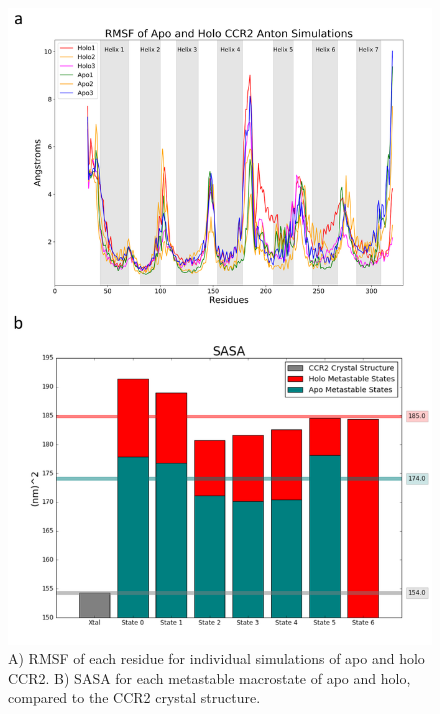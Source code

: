 \begin{figure}[htbp]
  \begin{center}
  \includegraphics[width=\textwidth,height=0.9\textheight,keepaspectratio]{./figures/rmsf_sasa.png}
 \caption[RMSF and SASA analysis of CCR2]{A) RMSF of each residue for individual simulations of apo and holo CCR2. B) SASA for each metastable macrostate of apo and holo, compared to the CCR2 crystal structure.}
  \label{fig:rmsf_sasa}
\end{center}
\end{figure}

